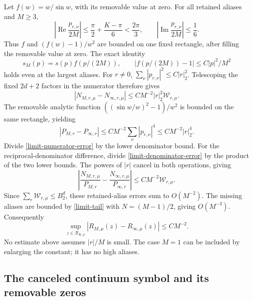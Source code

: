 Let $f(w)=w/\sin w$, with its removable value at zero. For all
retained aliases and $M\ge3$,
\begin{equation}\label{limit-compact-rectangle}
 \left|\operatorname{Re}\frac{p_{r,\nu}}{2M}\right|
 \le\frac\pi2+\frac{K-\pi}{6}<\frac{2\pi}3,
 \qquad
 \left|\operatorname{Im}\frac{p_{r,\nu}}{2M}\right|\le\frac16.
\end{equation}
Thus $f$ and $(f(w)-1)/w^2$ are bounded on one fixed rectangle,
after filling the removable value at zero. The exact identity
\begin{equation}\label{limit-factor-comparison}
 s_M(p)=s(p)f(p/(2M)),\qquad
 |f(p/(2M))-1|\le C|p|^2/M^2
\end{equation}
holds even at the largest aliases. For $r\ne0$,
$\sum_\nu|p_{r,\nu}|^2\le C|r|_2^2$. Telescoping the fixed
$2d+2$ factors in the numerator therefore gives
\begin{equation}\label{limit-numerator-error}
 |N_{M,r,\mu}-N_{\infty,r,\mu}|
 \le CM^{-2}|r|_2^2\mathcal W_{r,\mu}.
\end{equation}
The removable analytic function
$((\sin w/w)^2-1)/w^2$ is bounded on the same rectangle, yielding
\begin{equation}\label{limit-denominator-error}
 |P_{M,r}-P_{\infty,r}|
 \le CM^{-2}\sum_\nu|p_{r,\nu}|^4
 \le CM^{-2}|r|_2^4.
\end{equation}
Divide \eqref{limit-numerator-error} by the lower denominator bound.
For the reciprocal-denominator difference, divide
\eqref{limit-denominator-error} by the product of the two lower
bounds. The powers of $|r|$ cancel in both operations, giving
\begin{equation}\label{limit-summand-error}
 \left|\frac{N_{M,r,\mu}}{P_{M,r}}
       -\frac{N_{\infty,r,\mu}}{P_{\infty,r}}\right|
 \le CM^{-2}\mathcal W_{r,\mu}.
\end{equation}
Since $\sum_r\mathcal W_{r,\mu}\le B_2^d$, these retained-alias
errors sum to $O(M^{-2})$. The missing aliases are bounded by
\eqref{limit-tail} with $N=(M-1)/2$, giving $O(M^{-3})$. Consequently
\begin{equation}\label{limit-remainder-rate}
 \sup_{z\in\mathcal B_{K,\rho}}
 |R_{M,\mu}(z)-R_{\infty,\mu}(z)|\le CM^{-2}.
\end{equation}
No estimate above assumes $|r|/M$ is small. The case $M=1$ can be
included by enlarging the constant; it has no high aliases.

\subsection{The canceled continuum symbol and its removable zeros}

